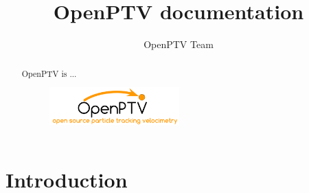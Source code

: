 \documentclass{report}
\begin{document}
\author{OpenPTV Team}
\title{OpenPTV documentation}
\pagestyle{empty}
\maketitle
\thispagestyle{empty}

\pagestyle{fancy}

\begin{abstract}
OpenPTV is ...

\begin{figure}[!ht]
\includegraphics[width=5cm]{img/OpenPTV_logo.png}
\end{figure}
\end{abstract}

\tableofcontents
\listoffigures
\newpage

\chapter{Introduction}





\appendix

\end{document}
